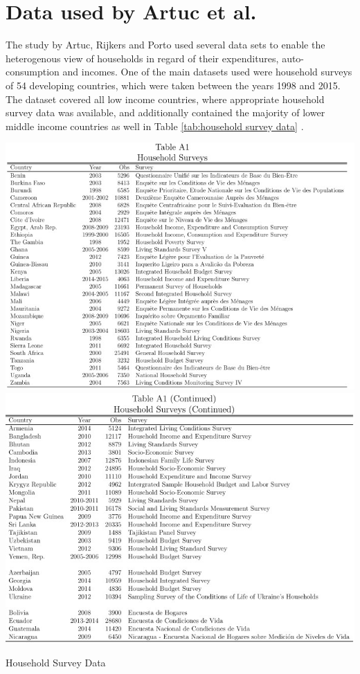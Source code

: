 \section{Data used by Artuc et al.}
The study by Artuc, Rijkers and Porto used several data sets to enable the heterogenous view of households in regard of their
expenditures, auto-consumption and incomes. One of the main datasets used were household surveys of 54 developing countries, 
which were taken between the years 1998 and 2015. The dataset covered all low income countries, where appropriate household survey
data was available, and additionally contained the majority of lower middle income countries as well in Table \ref{tab:household survey data}
\parencite[pp.~10-11]{Artuc.2019}.
\begin{table}[ht!]
    \centering
    \includegraphics*[scale=0.7]{graphics/householdsurvey1.jpg}
    \includegraphics*[scale=0.7]{graphics/householdsurvey2.jpg}
    \caption{Household Survey Data \parencite[pp.~56-57]{Artuc.2019}}
    \label{tab:household survey data}
\end{table}\\
